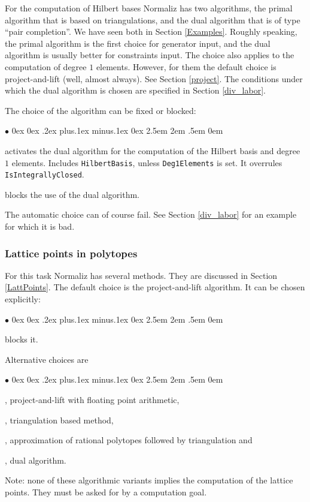 \documentclass[12pt,a4paper]{scrartcl}
\newcommand{\stdli}{ \topsep0ex \partopsep0ex %
\parsep.2ex plus.1ex minus.1ex \itemsep0ex%
\leftmargin2.5em \labelwidth2em \labelsep.5em \rightmargin0em}%
\renewenvironment{itemize}{\begin{list}{{$\bullet$}}{\stdli}}{\end{list}}
\theoremstyle{definition}
\def\itemtt[#1]{\item[\textbf{\ttt{#1}}]}
\def\ttt{\texttt}
\begin{document}
For the computation of Hilbert bases Normaliz has two algorithms, the primal algorithm that is based on triangulations, and the dual algorithm that is of type ``pair completion''. We have seen both in Section \ref{Examples}. Roughly speaking, the primal algorithm is the first choice for generator input, and the dual algorithm is usually better for constraints input. The choice also applies to the computation of degree $1$ elements. However, for them the default choice is project-and-lift (well, almost always). See Section \ref{project}. The conditions under which the dual algorithm is chosen are specified in Section \ref{div_labor}.

The choice of the algorithm can be fixed or blocked:
\begin{itemize}
	\itemtt[DualMode, -d] activates the dual algorithm for the computation of the Hilbert basis and degree $1$ elements. Includes \verb|HilbertBasis|, unless \verb|Deg1Elements| is set. It overrules \verb|IsIntegrallyClosed|.
	
	\itemtt[PrimalMode, -P] blocks the use of the dual algorithm.
\end{itemize}

The automatic choice can of course fail. See Section \ref{div_labor} for an example for which it is bad. 

\subsubsection{Lattice points in polytopes}\label{approximate}

For this task Normaliz has several methods. They are discussed in Section \ref{LattPoints}. The default choice is the project-and-lift algorithm. It can be chosen explicitly:
\begin{itemize}	
	\itemtt[Projection, -j] 
	
	\itemtt[NoProjection] blocks it.
\end{itemize}

Alternative choices are
\begin{itemize}
	\itemtt[ProjectionFloat, -J], project-and-lift with floating point arithmetic, 
	\itemtt[PrimalMode, -P], triangulation based method, 
	\itemtt [Approximate, -r], approximation of rational polytopes followed by triangulation and 
	\itemtt[DualMode, -d], dual algorithm.
\end{itemize}
Note: none of these algorithmic variants implies  the computation of the lattice points.  They must be asked for by a computation goal.
\end{document}
